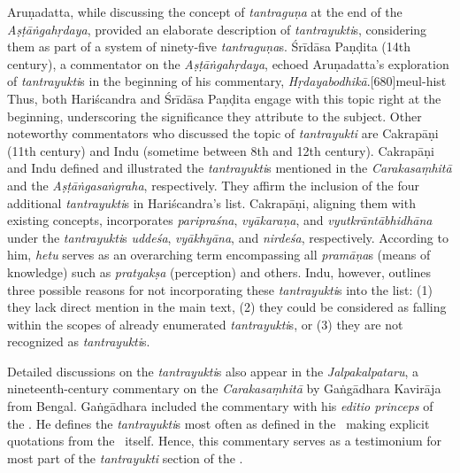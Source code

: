 Aruṇadatta, while discussing the concept of \emph{tantraguṇa} at the end of the \emph{Aṣṭāṅgahṛdaya}, 
provided an elaborate description of \emph{tantrayukti}s, 
considering them as part of a system of ninety-five \emph{tantraguṇa}s. 
Śrīdāsa Paṇḍita (14th century), a commentator on the \emph{Aṣṭāṅgahṛdaya}, 
echoed Aruṇadatta's exploration of \emph{tantrayukti}s 
in the beginning of his commentary, \emph{Hṛdayabodhikā}.[680]{meul-hist} 
Thus, both Hariścandra and Śrīdāsa Paṇḍita engage with this topic right at the beginning, 
underscoring the significance they attribute to the subject. 
Other noteworthy commentators who discussed the topic of \emph{tantrayukti} are Cakrapāṇi (11th century) 
and Indu (sometime between 8th and 12th century). 
Cakrapāṇi and Indu defined and illustrated the \emph{tantrayukti}s 
mentioned in the \emph{Carakasaṃhitā} and the \emph{Aṣṭāṅgasaṅgraha}, respectively. 
They affirm the inclusion of the four additional \emph{tantrayukti}s in Hariścandra's list. 
Cakrapāṇi, aligning them with existing concepts, 
incorporates \emph{paripraśna}, \emph{vyākaraṇa}, 
and \emph{vyutkrāntābhidhāna} under the \emph{tantrayukti}s \emph{uddeśa}, 
\emph{vyākhyāna}, and \emph{nirdeśa}, respectively. 
According to him, \emph{hetu} serves as an overarching term 
encompassing all \emph{pramāṇa}s (means of knowledge) 
such as \emph{pratyakṣa} (perception) and others. 
Indu, however, outlines three possible reasons 
for not incorporating these \emph{tantrayukti}s into the list: 
(1) they lack direct mention in the main text, 
(2) they could be considered as falling within the scopes of already enumerated \emph{tantrayukti}s, or 
(3) they are not recognized as \emph{tantrayukti}s. 

Detailed discussions on the \emph{tantrayukti}s also appear 
in the \emph{Jalpakalpataru}, a nineteenth-century commentary 
on the \emph{Carakasaṃhitā} by Gaṅgādhara Kavirāja from Bengal.
Gaṅgādhara included the commentary with his \emph{editio princeps} of the \CS. 
He defines the \emph{tantrayukti}s most often as defined in the \SS\ 
making explicit quotations from the \SS\ itself.
Hence, this commentary serves as a testimonium for most part 
of the \emph{tantrayukti} section of the \SS. 

